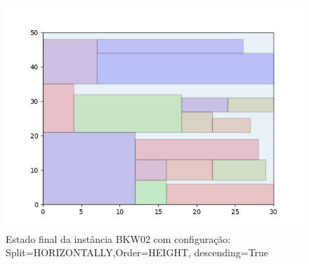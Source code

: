 \begin{figure}[H]
    \centering
    \caption[]{Estado final da instância BKW02 com configuração: Split=HORIZONTALLY,Order=HEIGHT, descending=True}
    \label{fig:bkw02-horizontally-height-true}
    \includegraphics[scale=0.5]{output/figures/bkw/bkw02/horizontally/height/true/00}
\end{figure}